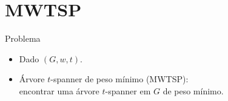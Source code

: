 \documentclass[dvipsnames]{beamer}
\newcommand{\R}{\mathbb{R}}
\begin{document}

\section{MWTSP}

\begin{frame}{Problema}
  \begin{itemize}
    \item Dado $(G,w,t)$.
    \item Árvore $t$-spanner de peso mínimo (MWTSP):\\
      encontrar uma árvore $t$-spanner em $G$ de peso mínimo.
  \end{itemize}
\end{frame}
\end{document}
